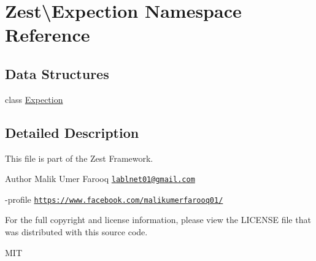 \hypertarget{namespace_zest_1_1_expection}{}\section{Zest\textbackslash{}Expection Namespace Reference}
\label{namespace_zest_1_1_expection}
\subsection*{Data Structures}
\begin{DoxyCompactItemize}
\item 
class \mbox{\hyperlink{class_zest_1_1_expection_1_1_expection}{Expection}}
\end{DoxyCompactItemize}


\subsection{Detailed Description}
This file is part of the Zest Framework.

\begin{DoxyAuthor}{Author}
Malik Umer Farooq \href{mailto:lablnet01@gmail.com}{\tt lablnet01@gmail.\+com} 

-\/profile \href{https://www.facebook.com/malikumerfarooq01/}{\tt https\+://www.\+facebook.\+com/malikumerfarooq01/}
\end{DoxyAuthor}
For the full copyright and license information, please view the L\+I\+C\+E\+N\+SE file that was distributed with this source code.

M\+IT 